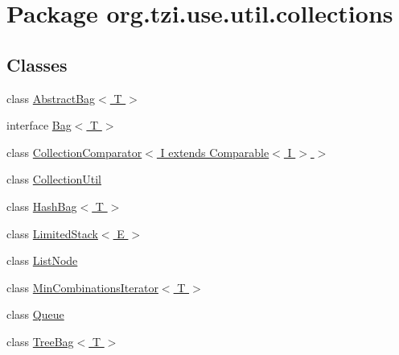 \hypertarget{namespaceorg_1_1tzi_1_1use_1_1util_1_1collections}{\section{Package org.\-tzi.\-use.\-util.\-collections}
\label{namespaceorg_1_1tzi_1_1use_1_1util_1_1collections}
}
\subsection*{Classes}
\begin{DoxyCompactItemize}
\item 
class \hyperlink{classorg_1_1tzi_1_1use_1_1util_1_1collections_1_1_abstract_bag_3_01_t_01_4}{Abstract\-Bag$<$ T $>$}
\item 
interface \hyperlink{interfaceorg_1_1tzi_1_1use_1_1util_1_1collections_1_1_bag_3_01_t_01_4}{Bag$<$ T $>$}
\item 
class \hyperlink{classorg_1_1tzi_1_1use_1_1util_1_1collections_1_1_collection_comparator_3_01_i_01extends_01_comparable_3_01_i_01_4_01_4}{Collection\-Comparator$<$ I extends Comparable$<$ I $>$ $>$}
\item 
class \hyperlink{classorg_1_1tzi_1_1use_1_1util_1_1collections_1_1_collection_util}{Collection\-Util}
\item 
class \hyperlink{classorg_1_1tzi_1_1use_1_1util_1_1collections_1_1_hash_bag_3_01_t_01_4}{Hash\-Bag$<$ T $>$}
\item 
class \hyperlink{classorg_1_1tzi_1_1use_1_1util_1_1collections_1_1_limited_stack_3_01_e_01_4}{Limited\-Stack$<$ E $>$}
\item 
class \hyperlink{classorg_1_1tzi_1_1use_1_1util_1_1collections_1_1_list_node}{List\-Node}
\item 
class \hyperlink{classorg_1_1tzi_1_1use_1_1util_1_1collections_1_1_min_combinations_iterator_3_01_t_01_4}{Min\-Combinations\-Iterator$<$ T $>$}
\item 
class \hyperlink{classorg_1_1tzi_1_1use_1_1util_1_1collections_1_1_queue}{Queue}
\item 
class \hyperlink{classorg_1_1tzi_1_1use_1_1util_1_1collections_1_1_tree_bag_3_01_t_01_4}{Tree\-Bag$<$ T $>$}
\end{DoxyCompactItemize}
